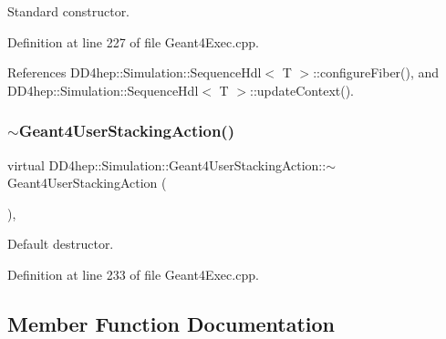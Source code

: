 Standard constructor. 



Definition at line 227 of file Geant4\+Exec.\+cpp.



References D\+D4hep\+::\+Simulation\+::\+Sequence\+Hdl$<$ T $>$\+::configure\+Fiber(), and D\+D4hep\+::\+Simulation\+::\+Sequence\+Hdl$<$ T $>$\+::update\+Context().

\hypertarget{class_d_d4hep_1_1_simulation_1_1_geant4_user_stacking_action_a023f102d73420bfab08e6a866ea03dc7}{}\label{class_d_d4hep_1_1_simulation_1_1_geant4_user_stacking_action_a023f102d73420bfab08e6a866ea03dc7} 
\subsubsection{\texorpdfstring{$\sim$\+Geant4\+User\+Stacking\+Action()}{~Geant4UserStackingAction()}}
{\footnotesize\ttfamily virtual D\+D4hep\+::\+Simulation\+::\+Geant4\+User\+Stacking\+Action\+::$\sim$\+Geant4\+User\+Stacking\+Action (\begin{DoxyParamCaption}{ }\end{DoxyParamCaption})\hspace{0.3cm}{\ttfamily [inline]}, {\ttfamily [virtual]}}



Default destructor. 



Definition at line 233 of file Geant4\+Exec.\+cpp.



\subsection{Member Function Documentation}
\hypertarget{class_d_d4hep_1_1_simulation_1_1_geant4_user_stacking_action_ae8abf4d3f1981b66637e9ceffbc9c604}{}\label{class_d_d4hep_1_1_simulation_1_1_geant4_user_stacking_action_ae8abf4d3f1981b66637e9ceffbc9c604} 
